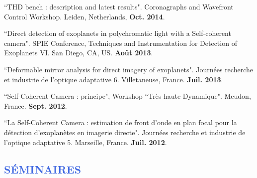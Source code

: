 \documentclass[11pt,a4paper, french]{article}
\begin{document}
\begin{etaremune}
\item ``THD bench : description and latest results". Coronagraphs and Wavefront Control Workshop. Leiden, Netherlands, \textbf{Oct. 2014}.

\item ``Direct detection of exoplanets in polychromatic light with a Self-coherent camera". SPIE Conference, Techniques and Instrumentation for Detection of Exoplanets VI. San Diego, CA, US. \textbf{Août 2013}.

\item ``Deformable mirror analysis for direct imagery of exoplanets". Journées recherche et industrie de l’optique adaptative 6. Villetaneuse, France. \textbf{Juil. 2013}.

\item ``Self-Coherent Camera : principe", Workshop ``Très haute Dynamique". Meudon, France. \textbf{Sept. 2012}.

\item ``La Self-Coherent Camera : estimation de front d'onde en plan focal pour la détection d'exoplanètes en imagerie directe". Journées recherche et industrie de l'optique adaptative 5. Marseille, France. \textbf{Juil. 2012}.
\end{etaremune}

\vspace{-0.8cm}
\textcolor{RoyalBlue}{\subsection{\large SÉMINAIRES}}
\end{document}
